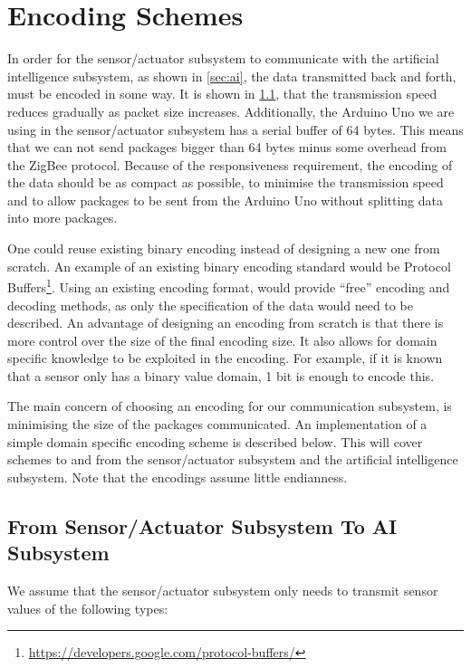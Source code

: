 \section{Encoding Schemes}

In order for the sensor/actuator subsystem to communicate with the artificial intelligence subsystem, as shown in \cref{sec:ai}, the data transmitted back and forth, must be encoded in some way. It is shown in \cref{}, that the transmission speed reduces gradually as packet size increases. Additionally, the Arduino Uno we are using in the sensor/actuator subsystem has a serial buffer of 64 bytes. This means that we can not send packages bigger than 64 bytes minus some overhead from the ZigBee protocol. Because of the responsiveness requirement, the encoding of the data should be as compact as possible, to minimise the transmission speed and to allow packages to be sent from the Arduino Uno without splitting data into more packages.

One could reuse existing binary encoding instead of designing a new one from scratch. An example of an existing binary encoding standard would be Protocol Buffers\footnote{\url{https://developers.google.com/protocol-buffers/}}. Using an existing encoding format, would provide \enquote{free} encoding and decoding methods, as only the specification of the data would need to be described. An advantage of designing an encoding from scratch is that there is more control over the size of the final encoding size. It also allows for domain specific knowledge to be exploited in the encoding. For example, if it is known that a sensor only has a binary value domain, 1 bit is enough to encode this.

The main concern of choosing an encoding for our communication subsystem, is minimising the size of the packages communicated. An implementation of a simple domain specific encoding scheme is described below. This will cover schemes to and from the sensor/actuator subsystem and the artificial intelligence subsystem. Note that the encodings assume little endianness.

\subsection{From Sensor/Actuator Subsystem To AI Subsystem}
We assume that the sensor/actuator subsystem only needs to transmit sensor values of the following types:

